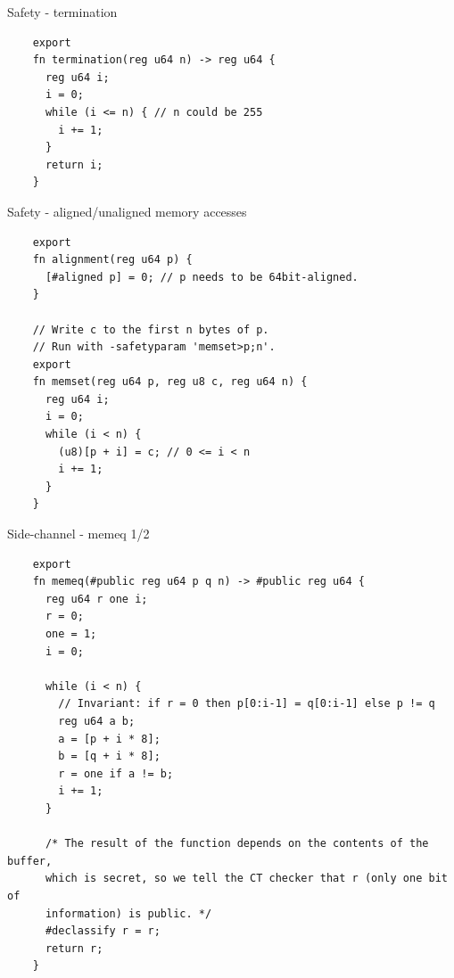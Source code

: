 \begin{frame}[fragile]{Safety - termination}
  \lstset{
    language=Jasmin,
    basicstyle=\footnotesize\ttfamily,
    escapechar=~~,
  }
  \begin{lstlisting}
    export
    fn termination(reg u64 n) -> reg u64 {
      reg u64 i;
      i = 0;
      while (i <= n) { // n could be 255
        i += 1;
      }
      return i;
    }
  \end{lstlisting}
\end{frame}

\begin{frame}[fragile]{Safety - aligned/unaligned memory accesses}
  \lstset{
    language=Jasmin,
    basicstyle=\footnotesize\ttfamily,
    escapechar=~~,
  }
  \begin{lstlisting}
    export
    fn alignment(reg u64 p) {
      [#aligned p] = 0; // p needs to be 64bit-aligned.
    }

    // Write c to the first n bytes of p.
    // Run with -safetyparam 'memset>p;n'.
    export
    fn memset(reg u64 p, reg u8 c, reg u64 n) {
      reg u64 i;
      i = 0;
      while (i < n) {
        (u8)[p + i] = c; // 0 <= i < n
        i += 1;
      }
    }
  \end{lstlisting}
\end{frame}

\begin{frame}[fragile]{Side-channel - memeq 1/2}
  \lstset{
    language=Jasmin,
    basicstyle=\scriptsize\ttfamily,
    escapechar=~~,
  }
  \begin{lstlisting}
    export
    fn memeq(#public reg u64 p q n) -> #public reg u64 {
      reg u64 r one i;
      r = 0;
      one = 1;
      i = 0;

      while (i < n) {
        // Invariant: if r = 0 then p[0:i-1] = q[0:i-1] else p != q
        reg u64 a b;
        a = [p + i * 8];
        b = [q + i * 8];
        r = one if a != b;
        i += 1;
      }

      /* The result of the function depends on the contents of the buffer,
      which is secret, so we tell the CT checker that r (only one bit of
      information) is public. */
      #declassify r = r;
      return r;
    }
  \end{lstlisting}
\end{frame}


